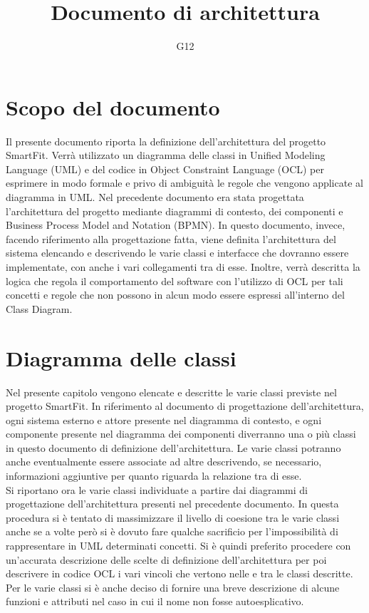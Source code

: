 \documentclass{article}
\author{G12}
\title{Documento di architettura}
\date{}
\begin{document}
      \maketitle 
      \tableofcontents
      \clearpage
      \section{Scopo del documento}
      Il presente documento riporta la definizione dell’architettura del progetto SmartFit. Verrà utilizzato un diagramma delle classi in Unified
      Modeling Language (UML) e del codice in Object Constraint Language (OCL) per esprimere in modo formale e privo di ambiguità le regole che
      vengono applicate al diagramma in UML. Nel precedente documento era stata progettata l’architettura del progetto mediante diagrammi di
      contesto, dei componenti e Business Process Model and Notation (BPMN). In questo documento, invece, facendo riferimento alla progettazione
      fatta, viene definita l’architettura del sistema elencando e descrivendo le varie classi e interfacce che dovranno essere implementate, con
      anche i vari collegamenti tra di esse. Inoltre, verrà descritta la logica che regola il comportamento del software con l’utilizzo di OCL per
      tali concetti e regole che non possono in alcun modo essere espressi all’interno del Class Diagram.\\

      \section{Diagramma delle classi}
      Nel presente capitolo vengono elencate e descritte le varie classi previste nel progetto SmartFit. In riferimento al documento di progettazione
      dell’architettura, ogni sistema esterno e attore presente nel diagramma di contesto, e ogni componente presente nel diagramma dei componenti
      diverranno una o più classi in questo documento di definizione dell’architettura. Le varie classi potranno anche eventualmente essere associate
      ad altre descrivendo, se necessario, informazioni aggiuntive per quanto riguarda la relazione tra di esse.\\


      Si riportano ora le varie classi individuate a partire dai diagrammi di progettazione dell’architettura presenti nel precedente documento.
      In questa procedura si è tentato di massimizzare il livello di coesione tra le varie classi anche se a volte però si è dovuto fare qualche
      sacrificio per l’impossibilità di rappresentare in UML determinati concetti. Si è quindi preferito procedere con un’accurata descrizione
      delle scelte di definizione dell’architettura per poi descrivere in codice OCL i vari vincoli che vertono nelle e tra le classi descritte.
      Per le varie classi si è anche deciso di fornire una breve descrizione di alcune funzioni e attributi nel caso in cui il nome non fosse autoesplicativo.\\
\end{document}
